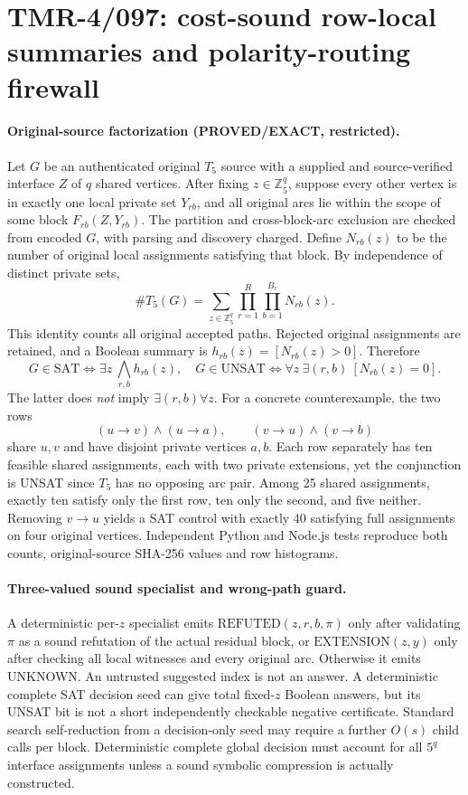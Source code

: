 \documentclass[11pt]{article}
\begin{document}
\section{TMR-4/097: cost-sound row-local summaries and polarity-routing firewall}

\paragraph{Original-source factorization (PROVED/EXACT, restricted).}
Let $G$ be an authenticated original $T_5$ source with a supplied and
source-verified interface $Z$ of $q$ shared vertices. After fixing
$z\in\mathbb Z_5^q$, suppose every other vertex is in exactly one local
private set $Y_{rb}$, and all original arcs lie within the scope of
some block $F_{rb}(Z,Y_{rb})$. The partition and cross-block-arc
exclusion are checked from encoded $G$, with parsing and discovery charged.
Define $N_{rb}(z)$ to be the number of original local assignments
satisfying that block. By independence of distinct private sets,
\[
 \boxed{\#T_5(G)=\sum_{z\in\mathbb Z_5^q}
                 \prod_{r=1}^{R}\prod_{b=1}^{B_r}N_{rb}(z).}
\]
This identity counts all original accepted paths. Rejected original
assignments are retained, and a Boolean summary is
$h_{rb}(z)=[N_{rb}(z)>0]$. Therefore
\[
 G\in\mathrm{SAT}\iff\exists z\ \bigwedge_{r,b}h_{rb}(z),\quad
 G\in\mathrm{UNSAT}\iff\forall z\ \exists(r,b)\ [N_{rb}(z)=0].
\]
The latter does \emph{not} imply $\exists(r,b)\forall z$.
For a concrete counterexample, the two rows
\[
 (u\to v)\wedge(u\to a),\qquad
 (v\to u)\wedge(v\to b)
\]
share $u,v$ and have disjoint private vertices $a,b$. Each row separately
has ten feasible shared assignments, each with two private extensions,
yet the conjunction is UNSAT since $T_5$ has no opposing arc pair.
Among 25 shared assignments, exactly ten satisfy only the first row,
ten only the second, and five neither. Removing $v\to u$ yields a
SAT control with exactly 40 satisfying full assignments on four
original vertices. Independent Python and Node.js tests reproduce both
counts, original-source SHA-256 values and row histograms.

\paragraph{Three-valued sound specialist and wrong-path guard.}
A deterministic per-$z$ specialist emits
$\mathrm{REFUTED}(z,r,b,\pi)$ only after validating $\pi$ as a sound
refutation of the actual residual block, or
$\mathrm{EXTENSION}(z,y)$ only after checking all local witnesses and
every original arc. Otherwise it emits UNKNOWN. An untrusted suggested
index is not an answer. A deterministic complete SAT decision seed can
give total fixed-$z$ Boolean answers, but its UNSAT bit is not a short
independently checkable negative certificate. Standard search
self-reduction from a decision-only seed may require a further
$O(s)$ child calls per block. Deterministic complete global decision
must account for all $5^q$ interface assignments unless a sound
symbolic compression is actually constructed.
\end{document}
